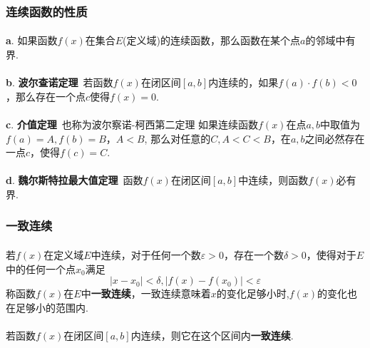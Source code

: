 \subsubsection{连续函数的性质}
\paragraph{}
\textbf{a}. 如果函数$f(x)$在集合$E$(定义域)的连续函数，那么函数在某个点$a$的邻域中有界. 

\paragraph{}
\textbf{b}. \textbf{波尔查诺定理}\, 若函数$f(x)$在闭区间$[a, b]$内连续的，如果$f(a) \cdot f(b) < 0$，那么存在一个点$c$使得$f(x) = 0$. 


\paragraph{}
\textbf{c}. \textbf{介值定理}\, 也称为波尔察诺-柯西第二定理 如果连续函数$f(x)$在点$a,b$中取值为$f(a) = A, f(b) = B， A < B$, 那么对任意的$C, A < C < B$，在$a, b$之间必然存在一点$c$，使得$f(c) = C$. 

\paragraph{}
\textbf{d}.  \textbf{魏尔斯特拉最大值定理}\, 函数$f(x)$在闭区间$[a, b]$中连续，则函数$f(x)$必有界.

\subsubsection{一致连续}
\paragraph{}
若$f(x)$在定义域$E$中连续，对于任何一个数$\varepsilon > 0$，存在一个数$\delta > 0$，使得对于$E$中的任何一个点$x_0$满足
$$
|x - x_0| < \delta, |f(x) - f(x_0)| < \varepsilon
$$
称函数$f(x)$在$E$中\textbf{一致连续}，一致连续意味着$x$的变化足够小时,$f(x)$的变化也在足够小的范围内. 

\paragraph{}
若函数$f(x)$在闭区间$[a, b]$内连续，则它在这个区间内\textbf{一致连续}.




